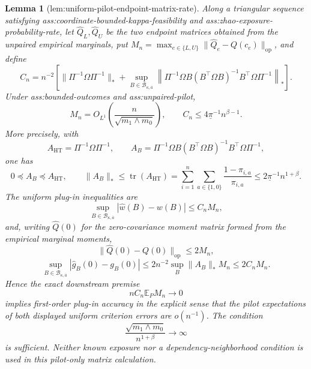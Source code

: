 \documentclass{article}
\newtheorem{lemma}{Lemma}
\begin{document}
\begin{lemma}[lem:uniform-pilot-endpoint-matrix-rate]\label{lem:uniform-pilot-endpoint-matrix-rate}
Along a triangular sequence satisfying ass:coordinate-bounded-kappa-feasibility and ass:zhao-exposure-probability-rate, let \(\widehat Q_L,\widehat Q_U\) be the two endpoint matrices obtained from the unpaired empirical marginals, put \(M_n=\max_{e\in\{L,U\}}\lVert\widehat Q_e-Q(c_e)\rVert_{\mathrm{op}}\), and define
\[
C_n=n^{-2}\left[
\lVert\Pi^{-1}\Omega\Pi^{-1}\rVert_*
+\sup_{B\in\mathcal B_{\kappa,\overline a}}
\left\lVert\Pi^{-1}\Omega B(B^{\top}\Omega B)^{-1}B^{\top}\Omega\Pi^{-1}\right\rVert_*
\right].
\]
Under ass:bounded-outcomes and ass:unpaired-pilot,
\[
M_n=O_{L^1}\!\left(\frac{n}{\sqrt{m_1\wedge m_0}}\right),
\qquad
C_n\le4\underline\pi^{-1}n^{\beta-1}.
\]
More precisely, with
\[
A_{\mathrm{HT}}=\Pi^{-1}\Omega\Pi^{-1},
\qquad
A_B=\Pi^{-1}\Omega B(B^{\top}\Omega B)^{-1}B^{\top}\Omega\Pi^{-1},
\]
one has
\[
0\preceq A_B\preceq A_{\mathrm{HT}},
\qquad
\lVert A_B\rVert_*
\le\operatorname{tr}(A_{\mathrm{HT}})
=\sum_{i=1}^n\sum_{a\in\{1,0\}}\frac{1-\pi_{i,a}}{\pi_{i,a}}
\le2\underline\pi^{-1}n^{1+\beta}.
\]
The uniform plug-in inequalities are
\[
\sup_{B\in\mathcal B_{\kappa,\overline a}}|\widehat w(B)-w(B)|
\le C_nM_n,
\]
and, writing \(\widehat Q(0)\) for the zero-covariance moment matrix formed from the empirical marginal moments,
\[
\lVert\widehat Q(0)-Q(0)\rVert_{\mathrm{op}}\le2M_n,
\]
\[
\sup_{B\in\mathcal B_{\kappa,\overline a}}|\widehat g_B(0)-g_B(0)|
\le2n^{-2}\sup_B\lVert A_B\rVert_*M_n
\le2C_nM_n.
\]
Hence the exact downstream premise
\[
nC_n\mathbb E_PM_n\longrightarrow0
\]
implies first-order plug-in accuracy in the explicit sense that the pilot expectations of both displayed uniform criterion errors are \(o(n^{-1})\).  The condition
\[
\frac{\sqrt{m_1\wedge m_0}}{n^{1+\beta}}\longrightarrow\infty
\]
is sufficient.  Neither known exposure nor a dependency-neighborhood condition is used in this pilot-only matrix calculation.
\end{lemma}
\end{document}
